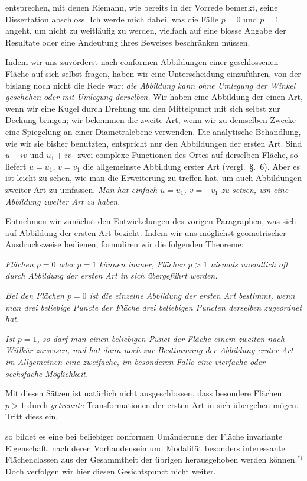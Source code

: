 \documentclass{article}
\begin{document}
entsprechen, mit denen Riemann, wie bereits in der Vorrede bemerkt, seine Dissertation abschloss. Ich werde mich dabei, was die Fälle $p = 0$ und $p = 1$ angeht, um nicht zu weitläufig zu werden, vielfach auf eine blosse Angabe der Resultate oder eine Andeutung ihres Beweises beschränken müssen.

Indem wir uns zuvörderst nach conformen Abbildungen einer geschlossenen Fläche auf sich selbst fragen, haben wir eine Unterscheidung einzuführen, von der bislang noch nicht die Rede war: \emph{die Abbildung kann ohne Umlegung der Winkel geschehen oder mit Umlegung derselben.} Wir haben eine Abbildung der einen Art, wenn wir eine Kugel durch Drehung um den Mittelpunct mit sich selbst zur Deckung bringen; wir bekommen die zweite Art, wenn wir zu demselben Zwecke eine Spiegelung an einer Diametralebene verwenden. Die analytische Behandlung, wie wir sie bisher benutzten, entspricht nur den Abbildungen der ersten Art. Sind $u + iv$ und $u_{1} + iv_{1}$ zwei complexe Functionen des Ortes auf derselben Fläche, so liefert $u = u_{1}$, $v = v_{1}$ die allgemeinste Abbildung erster Art (vergl.\ §.~6). Aber es ist leicht zu sehen, wie man die Erweiterung zu treffen hat, um auch Abbildungen zweiter Art zu umfassen. \emph{Man hat einfach $u = u_{1}$, $v = - v_{1}$ zu setzen, um eine Abbildung zweiter Art zu haben.}

Entnehmen wir zunächst den Entwickelungen des vorigen Paragraphen, was sich auf Abbildung der ersten Art bezieht. Indem wir uns möglichst geometrischer Ausdrucksweise bedienen, formuliren wir die folgenden Theoreme:

\emph{Flächen $p = 0$ oder $p = 1$ können immer, Flächen $p > 1$ niemals unendlich oft durch Abbildung der ersten Art in sich übergeführt werden.}

\emph{Bei den Flächen $p = 0$ ist die einzelne Abbildung der ersten Art bestimmt, wenn man drei beliebige Puncte der Fläche drei beliebigen Puncten derselben zugeordnet hat.}

\emph{Ist $p = 1$, so darf man einen beliebigen Punct der Fläche einem zweiten nach Willkür zuweisen, und hat dann noch zur Bestimmung der Abbildung erster Art im Allgemeinen eine zweifache, im besonderen Falle eine vierfache oder sechsfache Möglichkeit.}

Mit diesen Sätzen ist natürlich nicht ausgeschlossen, dass besondere Flächen $p > 1$ durch \emph{getrennte} Transformationen der ersten Art in sich übergehen mögen. Tritt diess ein,

so bildet es eine bei beliebiger conformen Umänderung der Fläche invariante Eigenschaft, nach deren Vorhandensein und Modalität besonders interessante Flächenclassen aus der Gesammtheit der übrigen herausgehoben werden können.${}^{*)}$ Doch verfolgen wir hier diesen Gesichtspunct nicht weiter.
\end{document}
